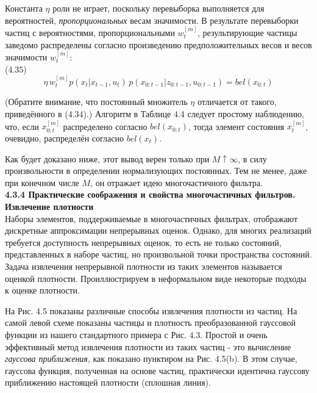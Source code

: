 \documentclass[10pt,a4paper]{article}
\begin{document}
Константа $\eta$ роли не играет, поскольку перевыборка выполняется для вероятностей, \textit{пропорциональных} весам значимости. В результате перевыборки частиц с вероятностями, пропорциональными $w_t^{[m]}$, результирующие частицы заведомо распределены согласно произведению предположительных весов и весов значимости $w_t^{[m]}$:\\

(4.35)
$$\eta\,w_t^{[m]}p(x_t|x_{t-1},u_t)\,p(x_{0:t-1}|z_{0:t-1},u_{0:t-1})=bel(x_{0:t})$$

(Обратите внимание, что постоянный множитель $\eta$ отличается от такого, приведённого в (4.34).) Алгоритм в Таблице 4.4 следует простому наблюдению, что, если $x_{0:t}^{[m]}$
распределено согласно $bel(x_{0:t})$, тогда элемент состояния $x_t^{[m]}$,  очевидно, распределён согласно $bel(x_t)$.

Как будет доказано ниже, этот вывод верен только при $M \uparrow \infty$, в силу произвольности в определении нормализующих постоянных. Тем не менее, даже при конечном числе $M$, он отражает идею многочастичного фильтра.\\

\textbf{4.3.4 Практические соображения и свойства многочастичных фильтров. Извлечение плотности}\\

Наборы элементов, поддерживаемые в многочастичных фильтрах, отображают дискретные аппроксимации непрерывных оценок. Однако, для многих реализаций требуется доступность непрерывных оценок, то есть не только состояний, представленных в наборе частиц, но произвольной точки пространства состояний. Задача извлечения непрерывной плотности из таких элементов называется оценкой плотности.
Проиллюстрируем в неформальном виде некоторые подходы к оценке плотности.

На Рис. 4.5 показаны различные способы извлечения плотности из частиц. 
На самой левой схеме показаны частицы и плотность преобразованной гауссовой функции из нашего стандартного примера с Рис. 4.3. Простой и очень эффективный метод извлечения плотности из таких частиц - это вычисление \textit{гауссова приближения}, как показано пунктиром на Рис. 4.5(b).
В этом случае, гауссова функция, полученная на основе частиц, практически идентична гауссову приближению настоящей плотности (сплошная линия).
\end{document}
